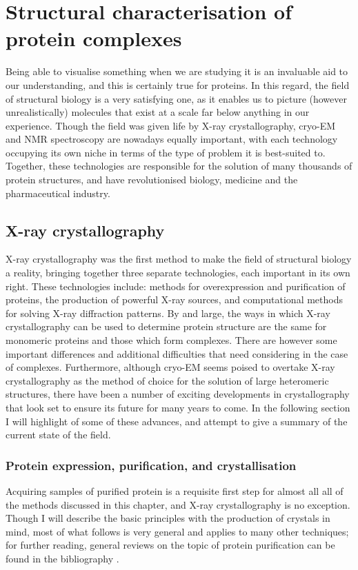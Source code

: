 \documentclass[a4paper,11pt,twoside,openright]{scrbook}
\begin{document}
\section{Structural characterisation of protein complexes}
Being able to visualise something when we are studying it is an invaluable aid to our understanding, and this is certainly true for proteins. In this regard, the field of structural biology is a very satisfying one, as it enables us to picture (however unrealistically) molecules that exist at a scale far below anything in our experience. Though the field was given life by X-ray crystallography, cryo-EM and NMR spectroscopy are nowadays equally important, with each technology occupying its own niche in terms of the type of problem it is best-suited to. Together, these technologies are responsible for the solution of many thousands of protein structures, and have revolutionised biology, medicine and the pharmaceutical industry.

\subsection{X-ray crystallography}
X-ray crystallography was the first method to make the field of structural biology a reality, bringing together three separate technologies, each important in its own right. These technologies include: methods for overexpression and purification of proteins, the production of powerful X-ray sources, and computational methods for solving X-ray diffraction patterns. By and large, the ways in which X-ray crystallography can be used to determine protein structure are the same for monomeric proteins and those which form complexes. There are however some important differences and additional difficulties that need considering in the case of complexes. Furthermore, although cryo-EM seems poised to overtake X-ray crystallography as the method of choice for the solution of large heteromeric structures, there have been a number of exciting developments in crystallography that look set to ensure its future for many years to come. In the following section I will highlight of some of these advances, and attempt to give a summary of the current state of the field.

\subsubsection{Protein expression, purification, and crystallisation}
Acquiring samples of purified protein is a requisite first step for almost all all of the methods discussed in this chapter, and X-ray crystallography is no exception. Though I will describe the basic principles with the production of crystals in mind, most of what follows is very general and applies to many other techniques; for further reading, general reviews on the topic of protein purification can be found in the bibliography \cite{Link2005,Graslund2008,LaCava2016}.
\end{document}
